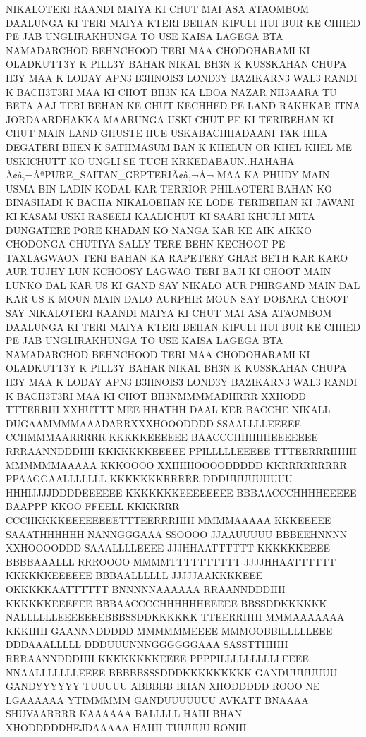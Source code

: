 NIKALOTERI RAANDI MAIYA KI CHUT MAI ASA
ATAOMBOM DAALUNGA KI TERI MAIYA KTERI
BEHAN KIFULI HUI BUR KE CHHED PE JAB
UNGLIRAKHUNGA TO USE KAISA LAGEGA BTA
NAMADARCHOD BEHNCHOOD TERI MAA
CHODOHARAMI KI OLADKUTT3Y K PILL3Y
BAHAR NIKAL BH3N K KUSSKAHAN CHUPA H3Y
MAA K LODAY APN3 B3HNOIS3 LOND3Y
BAZIKARN3 WAL3 RANDI K BACH3T3RI MAA KI
CHOT BH3N KA LDOA NAZAR NH3AARA TU BETA
AAJ TERI BEHAN KE CHUT KECHHED PE LAND
RAKHKAR ITNA JORDAARDHAKKA MAARUNGA
USKI CHUT PE KI TERIBEHAN KI CHUT MAIN
LAND GHUSTE HUE USKABACHHADAANI TAK
HILA DEGATERI BHEN K SATHMASUM BAN K
KHELUN OR KHEL KHEL ME USKICHUTT KO
UNGLI SE TUCH KRKEDABAUN..HAHAHA
Ã¢â‚¬ÂªPURE_SAITAN_GRPTERIÃ¢â‚¬Â¬ MAA KA
PHUDY MAIN USMA BIN LADIN KODAL KAR
TERRIOR PHILAOTERI BAHAN KO BINASHADI K
BACHA NIKALOEHAN KE LODE TERIBEHAN KI
JAWANI KI KASAM USKI RASEELI KAALICHUT KI
SAARI KHUJLI MITA DUNGATERE PORE KHADAN
KO NANGA KAR KE AIK AIKKO CHODONGA
CHUTIYA SALLY TERE BEHN KECHOOT PE
TAXLAGWAON TERI BAHAN KA RAPETERY GHAR
BETH KAR KARO AUR TUJHY LUN KCHOOSY
LAGWAO TERI BAJI KI CHOOT MAIN LUNKO DAL
KAR US KI GAND SAY NIKALO AUR PHIRGAND
MAIN DAL KAR US K MOUN MAIN DALO
AURPHIR MOUN SAY DOBARA CHOOT SAY
NIKALOTERI RAANDI MAIYA KI CHUT MAI ASA
ATAOMBOM DAALUNGA KI TERI MAIYA KTERI
BEHAN KIFULI HUI BUR KE CHHED PE JAB
UNGLIRAKHUNGA TO USE KAISA LAGEGA BTA
NAMADARCHOD BEHNCHOOD TERI MAA
CHODOHARAMI KI OLADKUTT3Y K PILL3Y
BAHAR NIKAL BH3N K KUSSKAHAN CHUPA H3Y
MAA K LODAY APN3 B3HNOIS3 LOND3Y
BAZIKARN3 WAL3 RANDI K BACH3T3RI MAA KI
CHOT BH3NMMMMADHRRR XXHODD TTTERRIII XXHUTTT 
MEE HHATHH DAAL KER BACCHE NIKALL 
DUGAAMMMMAAADARRXXXHOOODDDD 
SSAALLLLEEEEE CCHMMMAARRRRR 
KKKKKEEEEEE BAACCCHHHHHEEEEEEE RRRAANNDDDIIII 
KKKKKKKEEEEE PPILLLLLEEEEE TTTEERRRIIIIIII 
MMMMMMAAAAA KKKOOOO XXHHHOOOODDDDD
KKRRRRRRRRR PPAAGGAALLLLLLL KKKKKKKRRRRR 
DDDUUUUUUUUU HHHIJJJJDDDDEEEEEE
KKKKKKKEEEEEEEE BBBAACCCHHHHEEEEE BAAPPP 
KKOO FFEELL KKKKRRR CCCHKKKKEEEEEEEETTTEERRRIIIII 
MMMMAAAAA KKKEEEEE SAAATHHHHHH NANNGGGAAA
SSOOOO JJAAUUUUU BBBEEHNNNN XXHOOOODDD SAAALLLLEEEE
JJJHHAATTTTTT KKKKKKEEEE BBBBAAALLL RRROOOO
MMMMTTTTTTTTTT JJJJHHAATTTTTT KKKKKKEEEEEE BBBAALLLLLL 
JJJJJAAKKKKEEE OKKKKKAATTTTTT BNNNNNAAAAAA RRAANNDDDIIII 
KKKKKKEEEEEE BBBAACCCCHHHHHHEEEEE BBSSDDKKKKKK
NALLLLLLEEEEEEEBBBSSDDKKKKKK TTEERRIIIII MMMAAAAAAA KKKIIIII 
GAANNNDDDDD MMMMMMEEEE MMMOOBBILLLLLEEE DDDAAALLLLL 
DDDUUUNNNGGGGGGAAA SASSTTIIIIIII RRRAANNDDDIIII KKKKKKKKEEEE
PPPPILLLLLLLLLLEEEE NNAALLLLLLLEEEE BBBBBSSSDDDKKKKKKKKK
GANDUUUUUUU GANDYYYYYY TUUUUU ABBBBB BHAN XHODDDDD 
ROOO NE LGAAAAAA YTIMMMMM GANDUUUUUUU AVKATT BNAAAA SHUVAARRRR 
KAAAAAA BALLLLL HAIII BHAN XHODDDDDHEJDAAAAA HAIIII TUUUUU RONIII
